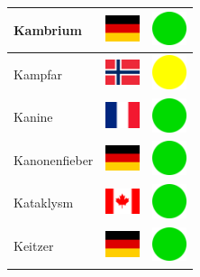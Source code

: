 \documentclass[12pt, a4paper, twoside]{report}
\begin{document}
\begin{center}
\begin{longtable}{|p{5cm}|p{2cm}|p{2cm}|}
 Kambrium                                                   & \includegraphics[width=1cm]{../4x3/de} &   \includegraphics[width=1cm]{../likes/y} \\ \hline
 Kampfar                                                    & \includegraphics[width=1cm]{../4x3/no} &   \includegraphics[width=1cm]{../likes/m} \\ \hline
 Kanine                                                     & \includegraphics[width=1cm]{../4x3/fr} &   \includegraphics[width=1cm]{../likes/y} \\ \hline
 Kanonenfieber                                              & \includegraphics[width=1cm]{../4x3/de} &   \includegraphics[width=1cm]{../likes/y} \\ \hline
 Kataklysm                                                  & \includegraphics[width=1cm]{../4x3/ca} &   \includegraphics[width=1cm]{../likes/y} \\ \hline
 Keitzer                                                    & \includegraphics[width=1cm]{../4x3/de} &   \includegraphics[width=1cm]{../likes/y} \\ \hline

\end{longtable}
\end{center}
\end{document}
